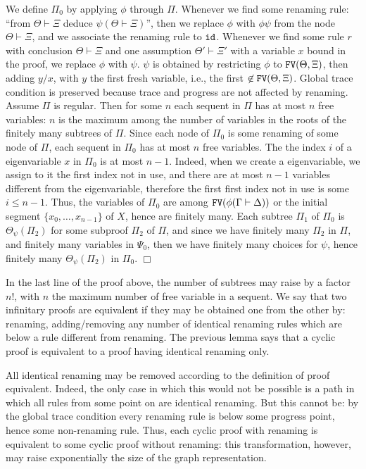 \documentclass[a4paper,12pt]{article}
\newenvironment{proof}[1][Proof]{\begin{trivlist}
\item[\hskip \labelsep {\bfseries #1}]}{\end{trivlist}}
\newcommand{\FV}              { {\tt FV} }
\newcommand{\id}              { {\tt id} }
\begin{document}
\begin{proof}
We define $\Pi_0$ by applying $\phi$ through $\Pi$. Whenever we find some renaming rule: ``from $\Theta \vdash \Xi$ deduce $\psi(\Theta \vdash \Xi)$'', then we replace $\phi$ with $\phi\psi$ from the node $\Theta \vdash \Xi$, and we associate the renaming rule to $\id$. 
Whenever we find some rule $r$ with conclusion $\Theta \vdash \Xi$ and one assumption $\Theta' \vdash \Xi'$ with a variable $x$ bound in the proof, we replace $\phi$ with $\psi$. $\psi$ is obtained by restricting $\phi$ to $\FV(\Theta, \Xi)$, then adding $y/x$, with $y$ the first fresh variable, i.e., the first $\not \in \FV(\Theta, \Xi)$. 
Global trace condition is preserved because trace and progress are not affected by renaming. Assume $\Pi$ is regular. Then for some $n$ each sequent in $\Pi$ has at most $n$ free variables: $n$ is the maximum among the number of variables in the roots of the finitely many subtrees of $\Pi$. 
Since each node of $\Pi_0$ is some renaming of some node of $\Pi$, each sequent in $\Pi_0$ has at most $n$ free variables. The the index $i$ of a eigenvariable $x$ in $\Pi_0$ is at most $n-1$. Indeed, when we create a eigenvariable, we assign to it the first index not in use, and there are at most $n-1$ variables different from the eigenvariable, therefore the first first index not in use is some $i \le n-1$. 
Thus, the variables of $\Pi_0$ are among $\FV(\phi(\Gamma \vdash \Delta))$ or the initial segment $\{x_0, \ldots, x_{n-1}\}$ of $X$, hence are finitely many. 
Each subtree $\Pi_1$ of $\Pi_0$ is $\Theta_\psi(\Pi_2)$ for some subproof $\Pi_2$ of $\Pi$, and since we have finitely many $\Pi_2$ in $\Pi$, and finitely many variables in $\Psi_0$, then we have finitely many choices for $\psi$, hence finitely many $\Theta_\psi(\Pi_2)$ in $\Pi_0$. 
$\Box$ \end{proof}

In the last line of the proof above, the number of subtrees may raise by a factor $n!$, with $n$ the maximum number of free variable in a sequent. We say that two infinitary proofs are equivalent if they may be obtained one from the other by: renaming, adding/removing any number of identical renaming rules which are below a rule different from renaming. The previous lemma says that a cyclic proof is equivalent to a proof having identical renaming only. 


All identical renaming may be removed according to the definition of proof equivalent. Indeed, the only case in which this would not be possible is a path in which all rules from some point on are identical renaming. But this cannot be: by the global trace condition every renaming rule is below some progress point, hence some non-renaming rule. Thus, each cyclic proof with renaming is equivalent to some cyclic proof without renaming: this transformation, however, may raise exponentially the size of the graph representation. 
\end{document}

